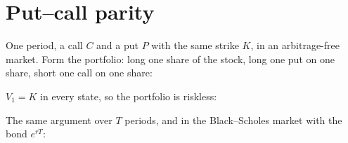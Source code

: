 \section{Put--call parity}\label{u:parity}
\begin{steps}
\item One period, a call $C$ and a put $P$ with the same strike $K$, in an arbitrage-free market. Form the portfolio: long one share of the stock, long one put on one share, short one call on one share:
\begin{deriv}
\end{deriv}
\item $V_1=K$ in every state, so the portfolio is riskless:
\begin{deriv}
\end{deriv}
\item The same argument over $T$ periods, and in the Black--Scholes market with the bond $e^{rT}$:
\begin{deriv}
\end{deriv}
\end{steps}

